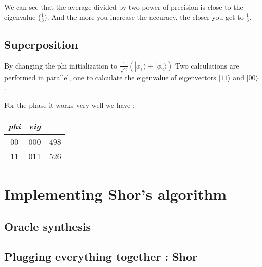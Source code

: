 \documentclass{article}
\theoremstyle{plain}
\begin{document}
      We can see that the average divided by two power of precision is close to
      the eigenvalue ($\frac 1 3$). And the more you increase the accuracy,
      the closer you get to $\frac 1 3$.
    \subsection{Superposition}

    By changing the phi initialization to $\frac1{\sqrt2}(|\phi_1\rangle + |\phi_2\rangle)$
    Two calculations are performed in parallel, one to calculate the eigenvalue
    of eigenvectors $|11\rangle$ and $|00\rangle$.

    For the phase it works very well we have :

    \begin{center}
      \begin{tabular}{c | c | l}
        \textit{phi} & \textit{eig} & \\
        \hline
        00 & 000 & 498 \\
        11 & 011 & 526 \\
      \end{tabular}
    \end{center}

  \section{Implementing Shor's algorithm}

    \subsection{Oracle synthesis}

    \subsection{Plugging everything together : Shor}
\end{document}
